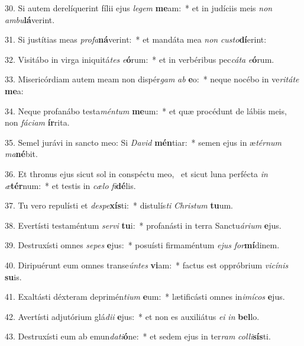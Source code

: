 30. Si autem derelíquerint fílii ejus \textit{le}\textit{gem} \textbf{me}am:~*  et in judíciis meis \textit{non} \textit{am}\textit{bu}\textbf{lá}verint.\

31. Si justítias meas \textit{pro}\textit{fa}\textbf{ná}verint:~*  et mandáta mea \textit{non} \textit{cus}\textit{to}\textbf{dí}erint:\

32. Visitábo in virga iniquitá\textit{tes} \textit{e}\textbf{ó}rum:~*  et in verbéribus pec\textit{cá}\textit{ta} \textit{e}\textbf{ó}rum.\

33. Misericórdiam autem meam non dispér\textit{gam} \textit{ab} \textbf{e}o:~*  neque nocébo in ve\textit{ri}\textit{tá}\textit{te} \textbf{me}a:\

34. Neque profanábo testa\textit{mén}\textit{tum} \textbf{me}um:~*  et quæ procédunt de lábiis meis, non \textit{fá}\textit{ci}\textit{am} \textbf{ír}rita.\

35. Semel jurávi in sancto meo: Si \textit{Da}\textit{vid} \textbf{mén}tiar:~*  semen ejus in æ\textit{tér}\textit{num} \textit{ma}\textbf{né}bit.\

36. Et thronus ejus sicut sol in conspéctu meo, \dag\  et sicut luna perfécta \textit{in} \textit{æ}\textbf{tér}num:~*  et testis in \textit{cæ}\textit{lo} \textit{fi}\textbf{dé}lis.\

37. Tu vero repulísti et \textit{de}\textit{spe}\textbf{xís}ti:~*  distulís\textit{ti} \textit{Chris}\textit{tum} \textbf{tu}um.\

38. Evertísti testaméntum \textit{ser}\textit{vi} \textbf{tu}i:~*  profanásti in terra Sanctu\textit{á}\textit{ri}\textit{um} \textbf{e}jus.\

39. Destruxísti omnes \textit{se}\textit{pes} \textbf{e}jus:~*  posuísti firmaméntum \textit{e}\textit{jus} \textit{for}\textbf{mí}dinem.\

40. Diripuérunt eum omnes transe\textit{ún}\textit{tes} \textbf{vi}am:~*  factus est oppróbrium \textit{vi}\textit{cí}\textit{nis} \textbf{su}is.\

41. Exaltásti déxteram deprimén\textit{ti}\textit{um} \textbf{e}um:~*  lætificásti omnes in\textit{i}\textit{mí}\textit{cos} \textbf{e}jus.\

42. Avertísti adjutórium glá\textit{di}\textit{i} \textbf{e}jus:~*  et non es auxiliátus \textit{e}\textit{i} \textit{in} \textbf{bel}lo.\

43. Destruxísti eum ab emun\textit{da}\textit{ti}\textbf{ó}ne:~*  et sedem ejus in ter\textit{ram} \textit{col}\textit{li}\textbf{sís}ti.\

